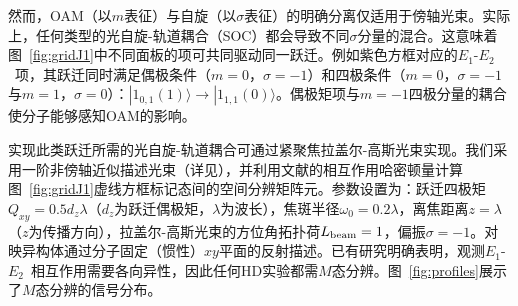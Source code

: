 \documentclass[reprint,aps,prl,twocolumn,superscriptaddress,groupedaddress]{revtex4-2}
\newcommand{\eoet}{$E_1$-$E_2$}
\begin{document}
\begin{CJK*}{UTF8}{gbsn}
然而，OAM（以$m$表征）与自旋（以$\sigma$表征）的明确分离仅适用于傍轴光束。实际上，任何类型的光自旋-轨道耦合（SOC）都会导致不同$\sigma$分量的混合\cite{Bliokh2015,Bliokh2023}。这意味着图~\ref{fig:gridJ1}中不同面板的项可共同驱动同一跃迁。例如紫色方框对应的\eoet~项，其跃迁同时满足偶极条件（$m=0$，$\sigma=-1$）和四极条件（$m=0$，$\sigma=-1$与$m=1$，$\sigma=0$）：$| 1_{0,1}(1) \rangle \to | 1_{1,1}(0) \rangle$。偶极矩项与$m=-1$四极分量的耦合使分子能够感知OAM的影响。

实现此类跃迁所需的光自旋-轨道耦合可通过紧聚焦拉盖尔-高斯光束实现\cite{Loeffler2011,Forbes2021nonparaxial,Forbes2021longitudinal}。我们采用一阶非傍轴近似描述光束\cite{Lax1975}（详见\cite{Note1}），并利用文献\cite{Maslov2024,Maslov_Thesis}的相互作用哈密顿量计算图~\ref{fig:gridJ1}虚线方框标记态间的空间分辨矩阵元。参数设置为：跃迁四极矩$Q_{xy}=0.5d_z\lambda$（$d_z$为跃迁偶极矩，$\lambda$为波长），焦斑半径$\omega_0=0.2\lambda$，离焦距离$z=\lambda$（$z$为传播方向），拉盖尔-高斯光束的方位角拓扑荷$L_{\rm beam}=1$，偏振$\sigma=-1$。对映异构体通过分子固定（惯性）$xy$平面的反射描述。已有研究明确表明\cite{Buckingham1971, Power1975}，观测\eoet~相互作用需要各向异性，因此任何HD实验都需$M$态分辨。图~\ref{fig:profiles}展示了$M$态分辨的信号分布。


\end{CJK*}
\end{document}
